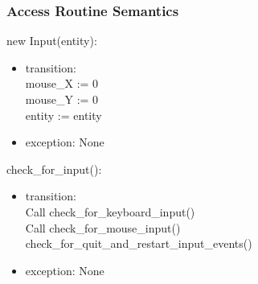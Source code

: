 \documentclass[12pt]{article}
\begin{document}
\subsubsection*{Access Routine Semantics}
new Input(entity):
\begin{itemize}
    \item transition:\\
    mouse\_X := 0\\
    mouse\_Y := 0\\
    entity := entity
    \item exception: None
\end{itemize}

check\_for\_input():
\begin{itemize}
    \item transition: \\
    Call check\_for\_keyboard\_input()\\
    Call check\_for\_mouse\_input()\\
    check\_for\_quit\_and\_restart\_input\_events()\\
    \item exception: None
\end{itemize}
\end{document}
